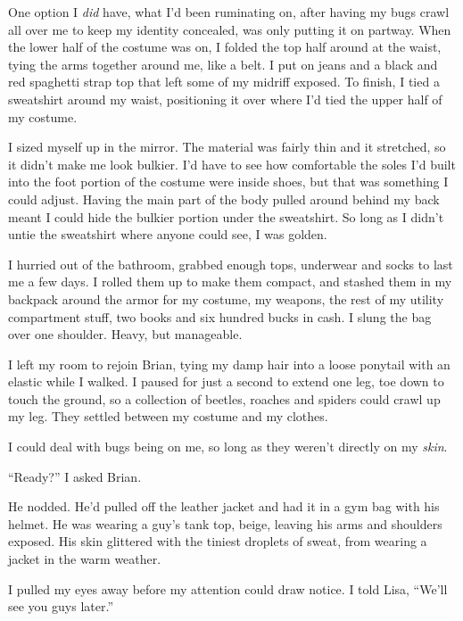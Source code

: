One option I \emph{did} have, what I'd been ruminating on, after having my bugs crawl all over me to keep my identity concealed, was only putting it on partway. When the lower half of the costume was on, I folded the top half around at the waist, tying the arms together around me, like a belt.  I put on jeans and a black and red spaghetti strap top that left some of my midriff exposed.  To finish, I tied a sweatshirt around my waist, positioning it over where I'd tied the upper half of my costume.



I sized myself up in the mirror.  The material was fairly thin and it stretched, so it didn't make me look bulkier.  I'd have to see how comfortable the soles I'd built into the foot portion of the costume were inside shoes, but that was something I could adjust.  Having the main part of the body pulled around behind my back meant I could hide the bulkier portion under the sweatshirt.  So long as I didn't untie the sweatshirt where anyone could see, I was golden.



I hurried out of the bathroom, grabbed enough tops, underwear and socks to last me a few days.  I rolled them up to make them compact, and stashed them in my backpack around the armor for my costume, my weapons, the rest of my utility compartment stuff, two books and six hundred bucks in cash.  I slung the bag over one shoulder.  Heavy, but manageable.



I left my room to rejoin Brian, tying my damp hair into a loose ponytail with an elastic while I walked.  I paused for just a second to extend one leg, toe down to touch the ground, so a collection of beetles, roaches and spiders could crawl up my leg.  They settled between my costume and my clothes.



I could deal with bugs being on me, so long as they weren't directly on my \emph{skin}.



``Ready?'' I asked Brian.



He nodded.  He'd pulled off the leather jacket and had it in a gym bag with his helmet.  He was wearing a guy's tank top, beige, leaving his arms and shoulders exposed.  His skin glittered with the tiniest droplets of sweat, from wearing a jacket in the warm weather.



I pulled my eyes away before my attention could draw notice.  I told Lisa, ``We'll see you guys later.''



